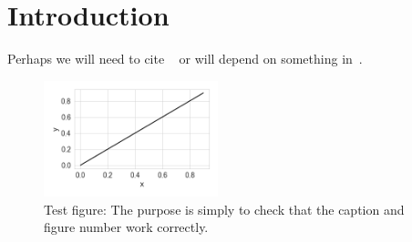 \section{Introduction}
\label{sec:intro}
Perhaps we will need to cite ~\citet{2019ApJ...873..111I} or will depend on something in~\citep{2009arXiv0912.0201L}.

\begin{figure}[!htp]
    \begin{center}
    \includegraphics[width=0.45\textwidth]{./figs/test_fig}
        \caption{Test figure: The purpose is simply to check that the caption and figure number work correctly.
    \label{fig:test_fig}
        }
    \end{center}
\end{figure}

